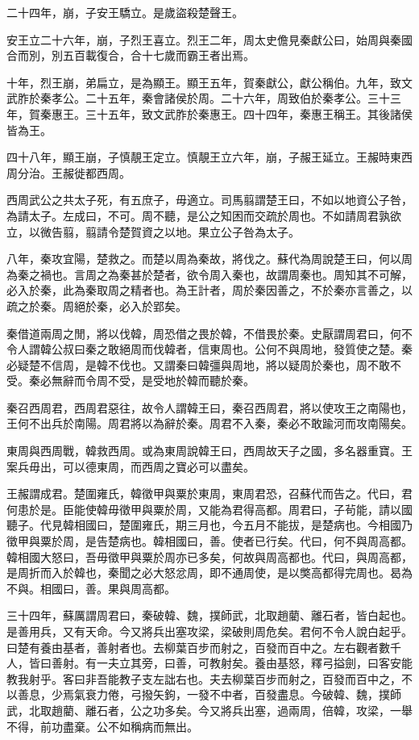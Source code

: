 二十四年，崩，子安王驕立。是歲盜殺楚聲王。

安王立二十六年，崩，子烈王喜立。烈王二年，周太史儋見秦獻公曰，始周與秦國合而別，別五百載復合，合十七歲而霸王者出焉。

十年，烈王崩，弟扁立，是為顯王。顯王五年，賀秦獻公，獻公稱伯。九年，致文武胙於秦孝公。二十五年，秦會諸侯於周。二十六年，周致伯於秦孝公。三十三年，賀秦惠王。三十五年，致文武胙於秦惠王。四十四年，秦惠王稱王。其後諸侯皆為王。

四十八年，顯王崩，子慎靚王定立。慎靚王立六年，崩，子赧王延立。王赧時東西周分治。王赧徙都西周。

西周武公之共太子死，有五庶子，毋適立。司馬翦謂楚王曰，不如以地資公子咎，為請太子。左成曰，不可。周不聽，是公之知困而交疏於周也。不如請周君孰欲立，以微告翦，翦請令楚賀資之以地。果立公子咎為太子。

八年，秦攻宜陽，楚救之。而楚以周為秦故，將伐之。蘇代為周說楚王曰，何以周為秦之禍也。言周之為秦甚於楚者，欲令周入秦也，故謂周秦也。周知其不可解，必入於秦，此為秦取周之精者也。為王計者，周於秦因善之，不於秦亦言善之，以疏之於秦。周絕於秦，必入於郢矣。

秦借道兩周之閒，將以伐韓，周恐借之畏於韓，不借畏於秦。史厭謂周君曰，何不令人謂韓公叔曰秦之敢絕周而伐韓者，信東周也。公何不與周地，發質使之楚。秦必疑楚不信周，是韓不伐也。又謂秦曰韓彊與周地，將以疑周於秦也，周不敢不受。秦必無辭而令周不受，是受地於韓而聽於秦。

秦召西周君，西周君惡往，故令人謂韓王曰，秦召西周君，將以使攻王之南陽也，王何不出兵於南陽。周君將以為辭於秦。周君不入秦，秦必不敢踰河而攻南陽矣。

東周與西周戰，韓救西周。或為東周說韓王曰，西周故天子之國，多名器重寶。王案兵毋出，可以德東周，而西周之寶必可以盡矣。

王赧謂成君。楚圍雍氏，韓徵甲與粟於東周，東周君恐，召蘇代而告之。代曰，君何患於是。臣能使韓毋徵甲與粟於周，又能為君得高都。周君曰，子茍能，請以國聽子。代見韓相國曰，楚圍雍氏，期三月也，今五月不能拔，是楚病也。今相國乃徵甲與粟於周，是告楚病也。韓相國曰，善。使者已行矣。代曰，何不與周高都。韓相國大怒曰，吾毋徵甲與粟於周亦已多矣，何故與周高都也。代曰，與周高都，是周折而入於韓也，秦聞之必大怒忿周，即不通周使，是以獘高都得完周也。曷為不與。相國曰，善。果與周高都。

三十四年，蘇厲謂周君曰，秦破韓、魏，撲師武，北取趙藺、離石者，皆白起也。是善用兵，又有天命。今又將兵出塞攻梁，梁破則周危矣。君何不令人說白起乎。曰楚有養由基者，善射者也。去柳葉百步而射之，百發而百中之。左右觀者數千人，皆曰善射。有一夫立其旁，曰善，可教射矣。養由基怒，釋弓搤劍，曰客安能教我射乎。客曰非吾能教子支左詘右也。夫去柳葉百步而射之，百發而百中之，不以善息，少焉氣衰力倦，弓撥矢鉤，一發不中者，百發盡息。今破韓、魏，撲師武，北取趙藺、離石者，公之功多矣。今又將兵出塞，過兩周，倍韓，攻梁，一舉不得，前功盡棄。公不如稱病而無出。

